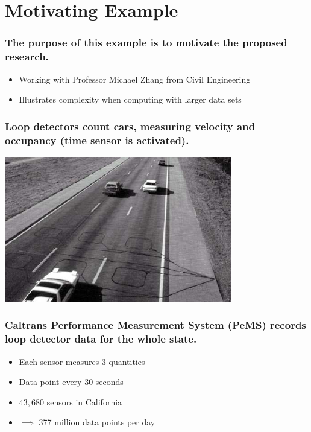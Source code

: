 \documentclass{beamer}
\begin{document}
\section{Motivating Example}
\begin{frame}

    \frametitle{The purpose of this example is to motivate the proposed
    research.}

    \begin{itemize}
        \item Working with Professor Michael Zhang from Civil Engineering
        \item Illustrates complexity when computing with larger data sets
    \end{itemize}

\end{frame}
\begin{frame}

    \frametitle{Loop detectors count cars, measuring velocity and
    occupancy (time sensor is activated).}

\centerline{\includegraphics[height=2.5in]{loop_detector.jpg}}

\end{frame}
\begin{frame}

\frametitle{Caltrans Performance Measurement System (PeMS) records loop
    detector
data for the whole state.}

    \begin{itemize}
        \item Each sensor measures 3 quantities
        \item Data point every 30 seconds
        \item $43,680$ sensors in California
        \item $\implies$  377 million data points per day
    \end{itemize}

\end{frame}
\end{document}
